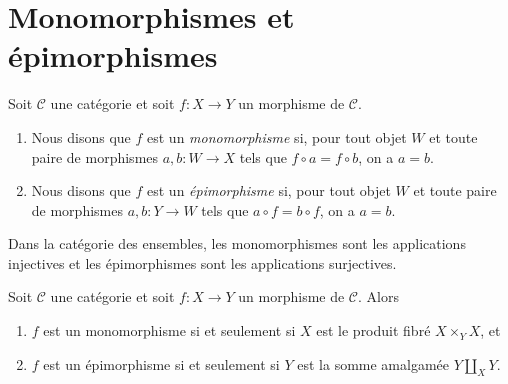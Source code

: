 \section{Monomorphismes et épimorphismes}
\label{section-mono-epi}

\begin{definition}
\label{definition-mono-epi}
Soit $\mathcal{C}$ une catégorie et soit $f : X \to Y$
un morphisme de $\mathcal{C}$.
\begin{enumerate}
\item Nous disons que $f$ est un {\it monomorphisme} si, pour tout objet
$W$ et toute paire de morphismes $a, b : W \to X$ tels que
$f \circ a = f \circ b$, on a $a = b$.
\item Nous disons que $f$ est un {\it épimorphisme} si, pour tout objet
$W$ et toute paire de morphismes $a, b : Y \to W$ tels que
$a \circ f = b \circ f$, on a $a = b$.
\end{enumerate}
\end{definition}

\begin{example}
\label{example-mono-epi-sets}
Dans la catégorie des ensembles, les monomorphismes sont les applications
injectives et les épimorphismes sont les applications surjectives.
\end{example}

\begin{lemma}
\label{lemma-characterize-mono-epi}
Soit $\mathcal{C}$ une catégorie et soit $f : X \to Y$
un morphisme de $\mathcal{C}$. Alors
\begin{enumerate}
\item $f$ est un monomorphisme si et seulement si $X$ est le produit
fibré $X \times_Y X$, et
\item $f$ est un épimorphisme si et seulement si $Y$ est la somme amalgamée
$Y \amalg_X Y$.
\end{enumerate}
\end{lemma}


